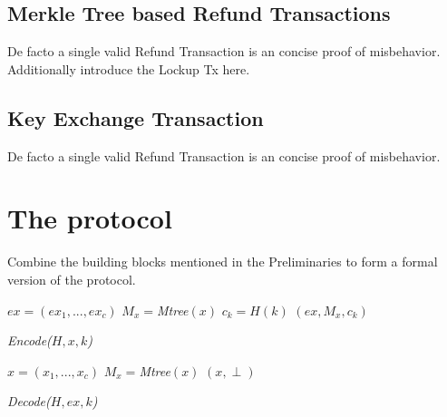 \documentclass{cacthesis}
\newcounter{protocol}
\begin{document}
        \subsection{Merkle Tree based Refund Transactions}
        De facto a single valid Refund Transaction is an concise proof of misbehavior. Additionally introduce the Lockup Tx here.
        
        \subsection{Key Exchange Transaction}
        De facto a single valid Refund Transaction is an concise proof of misbehavior.
        
        \section{The protocol}
        Combine the building blocks mentioned in the Preliminaries to form a formal version of the protocol.
                    \begin{algorithm}[H]
            \SetAlgoLined
              $ex = (ex_1,..., ex_c)$\;
              $M_x = $\textit{Mtree}$(x)$\;
              $c_k = H(k)$\;
             \Return $(ex, M_x, c_k)$\;
        
             \caption{\textit{Encode($H, x, k$)}}
            \end{algorithm}
            
            \begin{algorithm}[H]
            \SetAlgoLined
             $x = (x_1,..., x_c)$\;
             $M_x = $\textit{Mtree}$(x)$\;
             \Return $(x, \perp)$\;
             \caption{\textit{Decode($H, ex, k$)}}
            \end{algorithm}
            
\end{document}
